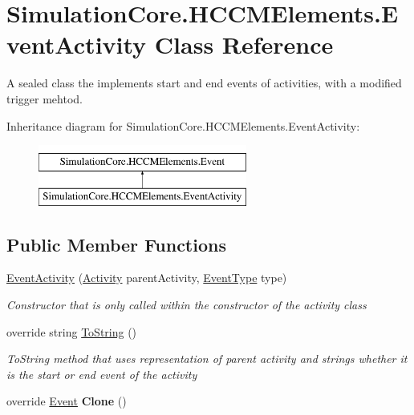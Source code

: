 \hypertarget{class_simulation_core_1_1_h_c_c_m_elements_1_1_event_activity}{}\section{Simulation\+Core.\+H\+C\+C\+M\+Elements.\+Event\+Activity Class Reference}
\label{class_simulation_core_1_1_h_c_c_m_elements_1_1_event_activity}


A sealed class the implements start and end events of activities, with a modified trigger mehtod.  


Inheritance diagram for Simulation\+Core.\+H\+C\+C\+M\+Elements.\+Event\+Activity\+:\begin{figure}[H]
\begin{center}
\leavevmode
\includegraphics[height=2.000000cm]{class_simulation_core_1_1_h_c_c_m_elements_1_1_event_activity}
\end{center}
\end{figure}
\subsection*{Public Member Functions}
\begin{DoxyCompactItemize}
\item 
\hyperlink{class_simulation_core_1_1_h_c_c_m_elements_1_1_event_activity_a80fbc8f681b999ebe67290a1e8337c34}{Event\+Activity} (\hyperlink{class_simulation_core_1_1_h_c_c_m_elements_1_1_activity}{Activity} parent\+Activity, \hyperlink{namespace_simulation_core_1_1_h_c_c_m_elements_a669ec0bd71214ac647777c49eb962e13}{Event\+Type} type)
\begin{DoxyCompactList}\small\item\em Constructor that is only called within the constructor of the activity class \end{DoxyCompactList}\item 
override string \hyperlink{class_simulation_core_1_1_h_c_c_m_elements_1_1_event_activity_ae6ebe43efa000c4dd8a74b5d39d4ef30}{To\+String} ()
\begin{DoxyCompactList}\small\item\em To\+String method that uses representation of parent activity and strings whether it is the start or end event of the activity \end{DoxyCompactList}\item 
override \hyperlink{class_simulation_core_1_1_h_c_c_m_elements_1_1_event}{Event} {\bfseries Clone} ()\hypertarget{class_simulation_core_1_1_h_c_c_m_elements_1_1_event_activity_a897c5c3ba83992f59f1d7dd5f3349afe}{}\label{class_simulation_core_1_1_h_c_c_m_elements_1_1_event_activity_a897c5c3ba83992f59f1d7dd5f3349afe}

\end{DoxyCompactItemize}
